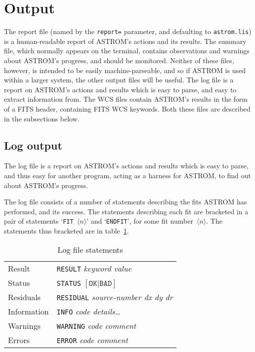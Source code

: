 \documentclass[twoside,11pt]{article}
\newcommand{\xlabel}[1]{}
\renewcommand{\_}{\texttt{\symbol{95}}}
\begin{document}
\section{\xlabel{output}Output}
\label{output}

The report file (named by the \texttt{report=} parameter, and defaulting to
\texttt{astrom.lis}) is a human-readable report of ASTROM's actions
and its results.  The summary file, which normally appears on the
terminal, contains observations and warnings about ASTROM's progress,
and should be monitored.  Neither of these files, however, is intended
to be easily machine-parseable, and so if ASTROM is used within a
larger system, the other output files will be useful.  The log file is
a report on ASTROM's actions and results which is easy to parse, and
easy to extract information from.  The WCS files contain ASTROM's
results in the form of a FITS header, containing FITS WCS keywords.
Both these files are described in the subsections below.

\subsection{\xlabel{output_log}Log output}
\label{output_log}

The log file is a report on ASTROM's actions and results which is easy
to parse, and thus easy for another program, acting as a harness for
ASTROM, to find out about ASTROM's progress.

The log file consists of a number of statements describing the fits
ASTROM has performed, and its success.  The statements describing each
fit are bracketed in a pair of statements `\texttt{FIT }$\langle
n\rangle$' and `\texttt{ENDFIT}', for some fit number~$\langle n\rangle$.
The statements thus bracketed are in table~\ref{t:logstatements}.
\begin{table}
\begin{center}
\begin{tabular}{|l|l|}
\hline
Result & \texttt{RESULT} \textit{keyword value} \\
Status & \texttt{STATUS} $[\texttt{OK} | \texttt{BAD}]$ \\
Residuals & \texttt{RESIDUAL} \textit{source-number dx dy dr} \\
Information & \texttt{INFO} \textit{code details\dots} \\
Warnings & \texttt{WARNING} \textit{code comment} \\
Errors & \texttt{ERROR} \textit{code comment} \\
\hline
\end{tabular}
\end{center}
\caption{\label{t:logstatements}Log file statements}
\end{table}
\end{document}
